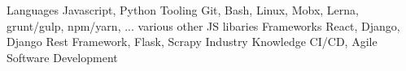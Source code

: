 
\begin{cvskills}
  \cvskill
    {Languages} %
    {Javascript, Python} %
  \cvskill
    {Tooling}
    {Git, Bash, Linux, Mobx, Lerna, grunt/gulp, npm/yarn, ... various other JS libaries}
  \cvskill
    {Frameworks} %
    {React, Django, Django Rest Framework, Flask, Scrapy} %
  \cvskill
    {Industry Knowledge}
    {CI/CD, Agile Software Development}
\end{cvskills}
